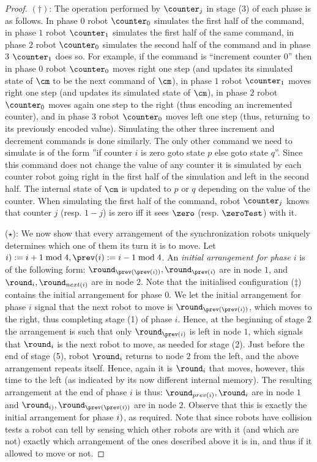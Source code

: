 \begin{proof}
$(\dagger)$: The operation performed by $\counter_j$ in stage (3) of each phase is as follows.
In phase $0$ robot $\counter_0$ simulates the first half of the command, in phase $1$ robot $\counter_1$ simulates the first half of the same command, in phase $2$ robot $\counter_0$ simulates the second half of the command and in phase $3$ $\counter_1$ does so. For example, if the command is ``increment counter $0$'' then in phase $0$ robot $\counter_0$ moves right one step (and updates its simulated state of $\cm$ to be the next command of $\cm$), in phase $1$ robot $\counter_1$ moves right one step (and updates its simulated state of $\cm$), in phase $2$ robot $\counter_0$ moves again one step to the right (thus encoding an incremented counter), and in phase $3$ robot $\counter_0$ moves left one step (thus, returning to its previously encoded value). Simulating the other three increment and decrement commands is done similarly. The only other command we need to simulate is of the form ''if counter $i$ is zero goto state $p$ else goto state $q$''. Since this command does not change the value of any counter it is simulated by each counter robot going right in the first half of the simulation and left in the second half. The internal state of $\cm$ is updated to $p$ or $q$ depending on the value of the counter. When simulating the first half of the command, robot $\counter_j$ knows that counter $j$ (resp. $1-j$) is zero iff it sees $\zero$ (resp. $\zeroTest$) with it.

($\star$): We now show that every arrangement of the synchronization robots uniquely determines which one of them its turn it is to move. Let $\next(i) := i+1 \bmod 4, \prev(i) := i-1 \bmod 4$. An {\em initial arrangement for phase $i$} is of the following form: $\round_{\prev(\prev(i))}, \round_{\prev(i)}$ are in node $1$, and $\round_i, \round_{next(i)}$ are in node $2$. Note that the initialised configuration ($\ddagger$) contains the initial arrangement for phase $0$. We let the initial arrangement for phase $i$ signal that the next robot to move is $\round_{\prev(\prev(i))}$, which moves to the right, thus completing stage (1) of phase $i$. Hence, at the beginning of stage $2$ the arrangement is such that only $\round_{\prev(i)}$ is left in node $1$, which signals that $\round_i$ is the next robot to move, as needed for stage (2). Just before the end of stage (5), robot $\round_i$  returns to node $2$ from the left, and the above arrangement repeats itself. Hence, again it is $\round_i$ that moves, however, this time to the left (as indicated by its now different internal memory). The resulting arrangement at the end of phase $i$ is thus: $\round_{prev(i)}, \round_i$ are in node $1$ and $\round_{\next(i)}, \round_{\prev(\prev(i))}$ are in node $2$. Observe that this is exactly the initial arrangement for phase $\next(i)$, as required. Note that since robots have collision tests a robot can tell by sensing which other robots are with it (and which are not) exactly which arrangement of the ones described above it is in, and thus if it allowed to move or not.


\end{proof}
